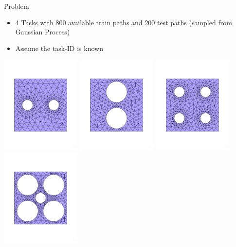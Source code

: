 \documentclass[aspectratio=169]{beamer}
\begin{document}
\begin{frame}{Problem}
    \begin{itemize}
      \item 4 Tasks with 800 available train paths and 200 test paths (sampled from Gaussian Process) 
      \item Assume the task-ID is known
    \end{itemize}
  \begin{minipage}{0.5\textwidth}
    \centering
    \includegraphics[width=0.3\textwidth]{figures/2_on_x.pdf}%
    \includegraphics[width=0.3\textwidth]{figures/2_on_y.pdf}
    \includegraphics[width=0.3\textwidth]{figures/4_diagonal.pdf}%
    \includegraphics[width=0.3\textwidth]{figures/5_star.pdf}

\end{minipage}
\end{frame}
\end{document}
